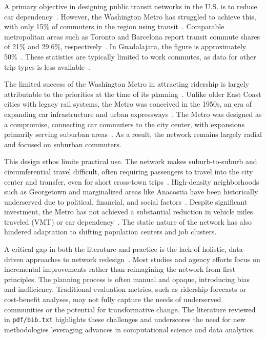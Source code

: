 \documentclass[manuscript]{acmart}
\begin{document}
A primary objective in designing public transit networks in the U.S. is to reduce car dependency~\cite{lit:us_transit_policy}. However, the Washington Metro has struggled to achieve this, with only 15\% of commuters in the region using transit~\cite{lit:commute_stats}. Comparable metropolitan areas such as Toronto and Barcelona report transit commute shares of 21\% and 29.6\%, respectively~\cite{lit:toronto, lit:barcelona}. In Guadalajara, the figure is approximately 50\%~\cite{lit:guadalajara}. These statistics are typically limited to work commutes, as data for other trip types is less available~\cite{lit:commute_stats}.

The limited success of the Washington Metro in attracting ridership is largely attributable to the priorities at the time of its planning~\cite{lit:wmata_history}. Unlike older East Coast cities with legacy rail systems, the Metro was conceived in the 1950s, an era of expanding car infrastructure and urban expressways~\cite{lit:us_highways}. The Metro was designed as a compromise, connecting car commuters to the city center, with expansions primarily serving suburban areas~\cite{lit:wmata_history}. As a result, the network remains largely radial and focused on suburban commuters.

This design ethos limits practical use. The network makes suburb-to-suburb and circumferential travel difficult, often requiring passengers to travel into the city center and transfer, even for short cross-town trips~\cite{bib:bast2016route}. High-density neighborhoods such as Georgetown and marginalized areas like Anacostia have been historically underserved due to political, financial, and social factors~\cite{bib:overview-field}. Despite significant investment, the Metro has not achieved a substantial reduction in vehicle miles traveled (VMT) or car dependency~\cite{bib:wmata-vmt}. The static nature of the network has also hindered adaptation to shifting population centers and job clusters.

A critical gap in both the literature and practice is the lack of holistic, data-driven approaches to network redesign~\cite{bib:camporeale2016equity}. Most studies and agency efforts focus on incremental improvements rather than reimagining the network from first principles. The planning process is often manual and opaque, introducing bias and inefficiency. Traditional evaluation metrics, such as ridership forecasts or cost-benefit analyses, may not fully capture the needs of underserved communities or the potential for transformative change. The literature reviewed in \texttt{pdf/bib.txt} highlights these challenges and underscores the need for new methodologies leveraging advances in computational science and data analytics.
\end{document}

